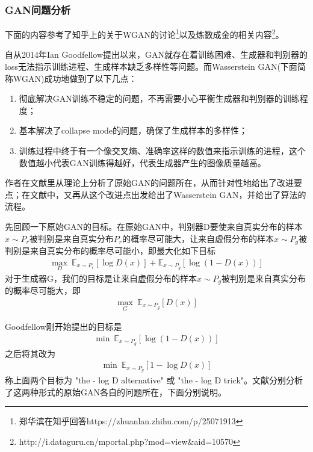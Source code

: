         \subsubsection{GAN问题分析}
            \par
            下面的内容参考了知乎上的关于WGAN的讨论\footnote{郑华滨在知乎回答https://zhuanlan.zhihu.com/p/25071913}以及炼数成金的相关内容\footnote{http://i.dataguru.cn/mportal.php?mod=view\&aid=10570}。
            \par
            自从2014年Ian Goodfellow提出以来，GAN就存在着训练困难、生成器和判别器的loss无法指示训练进程、生成样本缺乏多样性等问题。而Wasserstein GAN(下面简称WGAN)成功地做到了以下几点：
            \begin{enumerate}
            \item 彻底解决GAN训练不稳定的问题，不再需要小心平衡生成器和判别器的训练程度；
            \item 基本解决了collapse mode的问题，确保了生成样本的多样性；
            \item 训练过程中终于有一个像交叉熵、准确率这样的数值来指示训练的进程，这个数值越小代表GAN训练得越好，代表生成器产生的图像质量越高。
            \end{enumerate}
            \par
            作者在文献\cite{2017.Arjovsky}里从理论上分析了原始GAN的问题所在，从而针对性地给出了改进要点；在文献\cite{2017.Chen}中，又再从这个改进点出发给出了Wasserstein GAN，并给出了算法的流程。
            \par
            先回顾一下原始GAN的目标。在原始GAN中，判别器D要使来自真实分布的样本$x\sim P_r$被判别是来自真实分布$P_r$的概率尽可能大，让来自虚假分布的样本$x\sim P_g$被判别是来自真实分布的概率尽可能小，即最大化如下目标
            \begin{align*}
            \max_D \ \mathbb{E}_{x\sim P_r}[\log D(x)]  + \mathbb{E}_{x\sim P_g}[\log (1-D(x))]
            \end{align*}
            对于生成器G，我们的目标是让来自虚假分布的样本$x\sim P_g$被判别是来自真实分布的概率尽可能大，即
            \begin{align*}
            \max_G \ \mathbb{E}_{x\sim P_g}[D(x)]
            \end{align*}
            \par
            Goodfellow刚开始提出的目标是
            \begin{align}
            \label{GAN生成器原始目标1}
            \min \ \mathbb{E}_{x\sim P_g}[\log (1-D(x))]
            \end{align}
            之后将其改为
            \begin{align}
            \label{GAN生成器原始目标2}
            \min \ \mathbb{E}_{x\sim P_g}[1-\log D(x)]
            \end{align}
            称上面两个目标为 "the - log D alternative" 或 "the - log D trick"。文献\cite{2017.Arjovsky}分别分析了这两种形式的原始GAN各自的问题所在，下面分别说明。
